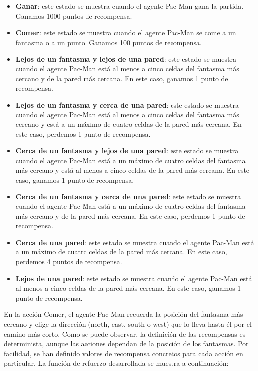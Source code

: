 \documentclass[11pt]{exam}
\begin{document}
\begin{itemize}
	\item \textbf{Ganar}: este estado se muestra cuando el agente Pac-Man gana la partida. Ganamos 1000 puntos de recompensa.
	
	\item \textbf{Comer}: este estado se muestra cuando el agente Pac-Man se come a un fantasma o a un punto. Ganamos 100 puntos de recompensa.
	
	\item \textbf{Lejos de un fantasma y lejos de una pared}: este estado se muestra cuando el agente Pac-Man está al menos a cinco celdas del fantasma más cercano y de la pared más cercana. En este caso, ganamos 1 punto de recompensa.
	
	\item \textbf{Lejos de un fantasma y cerca de una pared}: este estado se muestra cuando el agente Pac-Man está al menos a cinco celdas del fantasma más cercano y está a un máximo de cuatro celdas de la pared más cercana. En este caso, perdemos 1 punto de recompensa.
	
	\item \textbf{Cerca de un fantasma y lejos de una pared}: este estado se muestra cuando el agente Pac-Man está a un máximo de cuatro celdas del fantasma más cercano y está al menos a cinco celdas de la pared más cercana.  En este caso, ganamos 1 punto de recompensa.
	
	\item \textbf{Cerca de un fantasma y cerca de una pared}: este estado se muestra cuando el agente Pac-Man está a un máximo de cuatro celdas del fantasma más cercano y de la pared más cercana. En este caso, perdemos 1 punto de recompensa.
	
	\item \textbf{Cerca de una pared}: este estado se muestra cuando el agente Pac-Man está a un máximo de cuatro celdas de la pared más cercana. En este caso, perdemos 4 puntos de recompensa.
	
	\item \textbf{Lejos de una pared}: este estado se muestra cuando el agente Pac-Man está al menos a cinco celdas de la pared más cercana. En este caso, ganamos 1 punto de recompensa.
\end{itemize}

En la acción Comer, el agente Pac-Man recuerda la posición del fantasma más cercano y elige la dirección (north, east, south o west) que lo lleva hasta él por el camino más corto. Como se puede observar, la definición de las recompensas es determinista, aunque las acciones dependan de la posición de los fantasmas. Por facilidad, se han definido valores de recompensa concretos para cada acción en particular. La función de refuerzo desarrollada se muestra a continuación:
\end{document}
